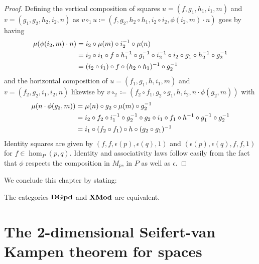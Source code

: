 \begin{proof}
Defining the vertical composition of squares $u = (f, g_1, h_1, i_1, m)$ and
$v = (g_1, g_2, h_2, i_2, n)$ as $v \circ_1 u \coloneqq 
(f, g_2, h_2 \circ h_1, i_2 \circ i_2, \phi(i_2, m) \cdot n)$ goes by having
\begin{align*}
\mu(\phi(i_2,m) \cdot n) &= i_2 \circ \mu(m) \circ i_2^{-1} \circ \mu(n)\\
	&= i_2 \circ i_1 \circ f \circ h_1^{-1} \circ g_1^{-1} \circ
		i_2^{-1} \circ i_2 \circ g_1 \circ h_2^{-1} \circ g_2^{-1} \\
	&= (i_2 \circ i_1) \circ f \circ (h_2 \circ h_1)^{-1} \circ g_2^{-1}
\end{align*}
and the horizontal composition of $u = (f_1, g_1, h, i_1, m)$ and
$v = (f_2, g_2, i_1, i_2, n)$ likewise by $v \circ_2 \coloneqq
(f_2 \circ f_1, g_2 \circ g_1, h, i_2, n \cdot \phi(g_2,m))$ with
\begin{align*}
\mu(n \cdot \phi(g_2,m)) &= \mu(n) \circ g_2 \circ \mu(m) \circ g_2^{-1} \\
	&= i_2 \circ f_2 \circ i_1^{-1} \circ g_2^{-1} \circ g_2 \circ
		i_1 \circ f_1 \circ h^{-1} \circ g_1^{-1} \circ g_2^{-1} \\
	&= i_1 \circ (f_2 \circ f_1) \circ h \circ (g_2 \circ g_1)^{-1}
\end{align*}
Identity squares are given by $(f,f,\epsilon(p),\epsilon(q),1)$ and
$(\epsilon(p),\epsilon(q),f,f,1)$ for $f \in \hom_P(p,q)$. Identity and
associativity laws follow easily from the fact that $\phi$ respects the composition
in $M_p$, in $P$ as well as $\epsilon$.
\end{proof}

We conclude this chapter by stating:
\begin{thm}
The categories $\mathbf{DGpd}$ and $\mathbf{XMod}$ are equivalent.
\end{thm}



\section{The 2-dimensional Seifert-van Kampen theorem for spaces}











